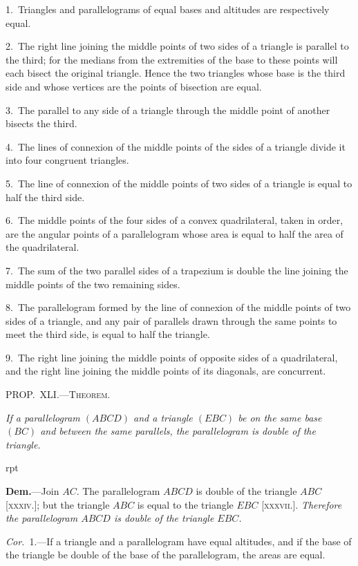\documentclass[oneside]{book}
\newcounter{wrapwidth}
\newcommand\mypropl[2]{
\bigskip\Needspace*{4\baselineskip}\begin{center}\textsc{#1}\end{center}
\hspace{\parindent}\emph{#2}\par\medskip
}
\newcommand\imgflow[3]{
\setcounter{wrapwidth}{#1}

\begin{wrapfigure}[#2]{r}{\value{wrapwidth}pt}
\begin{center}
\vspace{-0.3in}

\end{center}
\end{wrapfigure}
}
\begin{document}
\begin{footnotesize}
1.~Triangles and parallelograms of equal bases and altitudes
are respectively equal.

2.~The right line joining the middle points of two sides of a
triangle is parallel to the third; for the medians from the extremities
of the base to these points will each bisect the original
triangle. Hence the two triangles whose base is the third side
and whose vertices are the points of bisection are equal.

3.~The parallel to any side of a triangle through the middle
point of another bisects the third.

4.~The lines of connexion of the middle points of the sides of
a triangle divide it into four congruent triangles.

5.~The line of connexion of the middle points of two sides of
a triangle is equal to half the third side.

6.~The middle points of the four sides of a convex quadrilateral,
taken in order, are the angular points of a parallelogram whose
area is equal to half the area of the quadrilateral.

7.~The sum of the two parallel sides of a trapezium is double
the line joining the middle points of the two remaining sides.

8.~The parallelogram formed by the line of connexion of the
middle points of two sides of a triangle, and any pair of parallels
drawn through the same points to meet the third side, is equal to
half the triangle.

9.~The right line joining the middle points of opposite sides
of a quadrilateral, and the right line joining the middle points
of its diagonals, are concurrent.
\par\end{footnotesize}



\mypropl{PROP\@.~XLI\@.---Theorem.}{If a parallelogram $(ABCD)$ and a triangle $(EBC)$ be
on the same base $(BC)$ and between the same parallels, the
parallelogram is double of the triangle.}


\imgflow{128}{8}{f061}

\textbf{Dem.}---Join $AC$. The parallelogram $ABCD$ is double
of the triangle $ABC$ [\textsc{xxxiv}.];
but the triangle $ABC$ is equal
to the triangle $EBC$ [\textsc{xxxvii}.].
\emph{Therefore the parallelogram
$ABCD$ is double of the triangle
$EBC$.}

\textit{Cor.}~1.---If a triangle and
a parallelogram have equal altitudes, and if the base
of the triangle be double of the base of the parallelogram,
the areas are equal.
\end{document}
